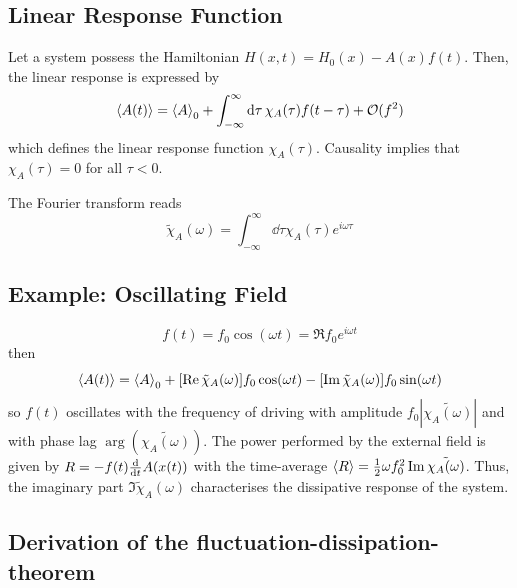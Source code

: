 \documentclass{/home/ben/Templates/notebook}
\begin{document}
	\subsection*{Linear Response Function}
	
	Let a system possess the Hamiltonian $H(x,t) = H_0(x) - A(x) f(t)$. Then, the linear response is expressed by
	\begin{equation}
	\expval{A(t)} = \expval{A}_0 + \int_{-\infty}^{\infty} \dd{\tau} \chi_A(\tau) f(t-\tau) + \mathcal{O}(f^2)
	\end{equation}
	which defines the linear response function $\chi_A(\tau)$. Causality implies that $\chi_A(\tau) = 0$ for all $\tau < 0$.
	
	The Fourier transform reads
	\begin{equation}
	\tilde{\chi}_A(\omega) = \int_{-\infty}^{\infty} \dd{\tau} \chi_A(\tau) e^{i \omega \tau}
	\end{equation}
	
	\subsection*{Example: Oscillating Field}
	\begin{equation}
	f(t) = f_0 \cos(\omega t) = \Re f_0 e^{i \omega t}
	\end{equation}
	then
	\begin{equation}
	\expval{A(t)} = \expval{A}_0 + [\Re \tilde{\chi}_A(\omega)] f_0 \cos(\omega t) - [\Im \tilde{\chi}_A(\omega)] f_0 \sin(\omega t)
	\end{equation}
	so $f(t)$ oscillates with the frequency of driving with amplitude $f_0 |\tilde{\chi_A(\omega)}|$ and with phase lag $\arg(\tilde{\chi_A(\omega)})$. The power performed by the external field is given by $R = - f(t) \dv{t} A(x(t))$ with the time-average $\expval{R} = \frac{1}{2} \omega f_0^2 \Im \tilde{\chi_A(\omega)}$. Thus, the imaginary part $\Im \tilde{\chi}_A(\omega)$ characterises the dissipative response of the system.
	
	\subsection*{Derivation of the fluctuation-dissipation-theorem}
	
\end{document}
